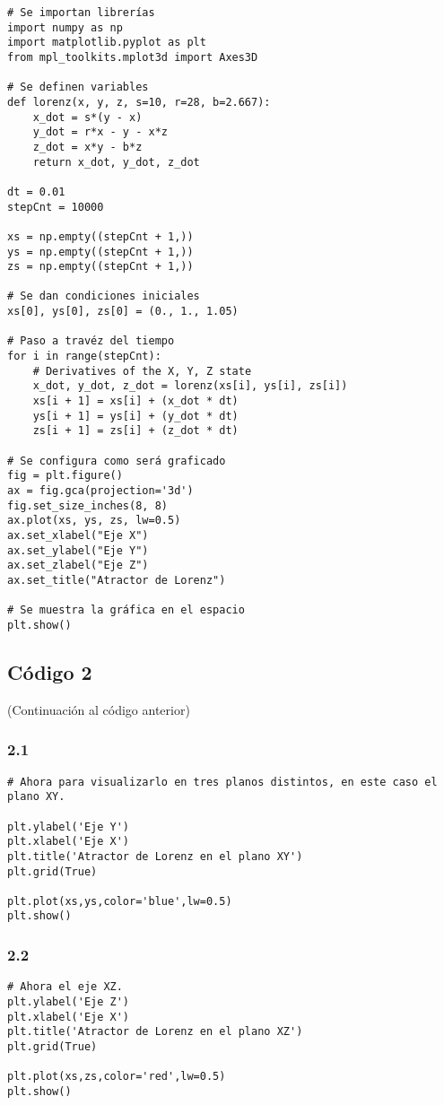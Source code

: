\documentclass[12pt,a4paper]{article}
\begin{document}
\begin{verbatim}
# Se importan librerías
import numpy as np
import matplotlib.pyplot as plt
from mpl_toolkits.mplot3d import Axes3D

# Se definen variables
def lorenz(x, y, z, s=10, r=28, b=2.667):
    x_dot = s*(y - x)
    y_dot = r*x - y - x*z
    z_dot = x*y - b*z
    return x_dot, y_dot, z_dot

dt = 0.01
stepCnt = 10000

xs = np.empty((stepCnt + 1,))
ys = np.empty((stepCnt + 1,))
zs = np.empty((stepCnt + 1,))

# Se dan condiciones iniciales
xs[0], ys[0], zs[0] = (0., 1., 1.05)

# Paso a travéz del tiempo
for i in range(stepCnt):
    # Derivatives of the X, Y, Z state
    x_dot, y_dot, z_dot = lorenz(xs[i], ys[i], zs[i])
    xs[i + 1] = xs[i] + (x_dot * dt)
    ys[i + 1] = ys[i] + (y_dot * dt)
    zs[i + 1] = zs[i] + (z_dot * dt)
    
# Se configura como será graficado    
fig = plt.figure()
ax = fig.gca(projection='3d')
fig.set_size_inches(8, 8)
ax.plot(xs, ys, zs, lw=0.5)
ax.set_xlabel("Eje X")
ax.set_ylabel("Eje Y")
ax.set_zlabel("Eje Z")
ax.set_title("Atractor de Lorenz")

# Se muestra la gráfica en el espacio
plt.show()
\end{verbatim}

\subsection{Código 2}
(Continuación al código anterior)

\subsubsection{2.1}
\begin{verbatim}
# Ahora para visualizarlo en tres planos distintos, en este caso el plano XY.

plt.ylabel('Eje Y')
plt.xlabel('Eje X')
plt.title('Atractor de Lorenz en el plano XY')
plt.grid(True)

plt.plot(xs,ys,color='blue',lw=0.5)
plt.show()
\end{verbatim}

\subsubsection{2.2}
\begin{verbatim}
# Ahora el eje XZ.
plt.ylabel('Eje Z')
plt.xlabel('Eje X')
plt.title('Atractor de Lorenz en el plano XZ')
plt.grid(True)

plt.plot(xs,zs,color='red',lw=0.5)
plt.show()
\end{verbatim}
\end{document}
